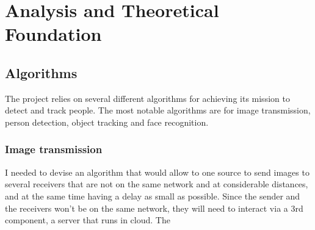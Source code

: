 
\chapter{Analysis and Theoretical Foundation}
\label{ch:analysis}

%
%
%

\section{Algorithms}
\label{sec:analysis-algorithms}
 The project relies on several different algorithms for achieving its mission to detect and track people.
 The most notable algorithms are for image transmission, person detection, object tracking and face recognition.

\subsection{Image transmission}
\label{subsec:image-transmission}
 I needed to devise an algorithm that would allow to one source to send images to several receivers that are
 not on the same network and at considerable distances, and at the same time having a delay as small as possible.
 Since the sender and the receivers won't be on the same network, they will need to interact via a 3rd component,
 a server that runs in cloud.
 The

